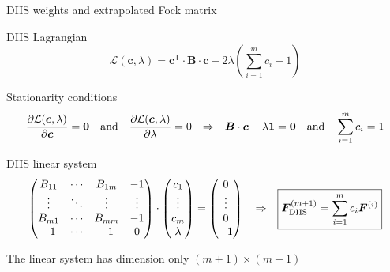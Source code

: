\documentclass[aspectratio=169,9pt]{beamer}
\newcommand{\bc}{\boldsymbol{c}}
\newcommand{\bB}{\boldsymbol{B}}
\newcommand{\bO}{\boldsymbol{0}}
\newcommand{\bF}{\boldsymbol{F}}
\begin{document}
\begin{frame}{DIIS weights and extrapolated Fock matrix}
	\begin{block}{DIIS Lagrangian}
	\begin{equation*}
		\mathcal{L}(\bc,\lambda)
		=
		\bc^\mathsf{T} \cdot \bB \cdot \bc
		-
		2\lambda
		\left(
			\sum_{i=1}^{m}c_i - 1
		\right)
	\end{equation*}
	\end{block}

	\begin{block}{Stationarity conditions}
	\begin{equation*}
		\pdv{\mathcal{L}(\bc,\lambda)}{\bc} = \bO
		\qand
		\pdv{\mathcal{L}(\bc,\lambda)}{\lambda} = 0
		\qq{$\Rightarrow$}
		\bB \cdot \bc-\lambda\boldsymbol{1}=\bO
		\qand
		\sum_{i=1}^{m}c_i=1
	\end{equation*}
	\end{block}

	\begin{block}{DIIS linear system}
	\begin{equation*}
		\begin{pmatrix}
			B_{11} & \cdots & B_{1m} & -1 \\
			\vdots & \ddots & \vdots & \vdots \\
			B_{m1} & \cdots & B_{mm} & -1 \\
			-1     & \cdots & -1     & 0
		\end{pmatrix}
		\cdot
		\begin{pmatrix}
			c_1 \\ \vdots \\ c_m \\ \lambda
		\end{pmatrix}
		=
		\begin{pmatrix}
			0 \\ \vdots \\ 0 \\ -1
		\end{pmatrix}
		\qq{$\Rightarrow$}
		\boxed{
			\bF_\text{DIIS}^{(m+1)}
			=
			\sum_{i=1}^{m}c_i\bF^{(i)}
		}
	\end{equation*}
	\end{block}
	\vfill
	\qq{$\Rightarrow$} \alert{The linear system has dimension only $(m+1)\times(m+1)$}
\end{frame}

\end{document}
